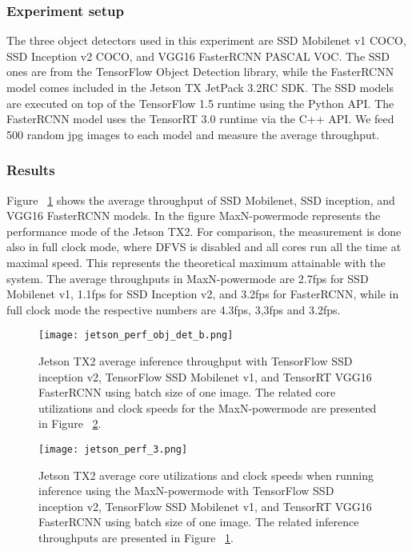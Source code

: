 \documentclass[sigconf]{acmart}
\begin{document}
\subsubsection{Experiment setup}

The three object detectors used in this experiment are SSD Mobilenet v1 COCO, SSD Inception v2 COCO, and VGG16 FasterRCNN PASCAL VOC. The SSD ones are from the TensorFlow Object Detection library, while the FasterRCNN model comes included in the Jetson TX JetPack 3.2RC SDK. The SSD models are executed on top of the TensorFlow 1.5 runtime using the Python API. The FasterRCNN model uses the TensorRT 3.0 runtime via the C++ API. We feed 500 random jpg images to each model and measure the average throughput.

\subsubsection{Results}

Figure ~\ref{fig:jetson_perf_obj_det} shows the average throughput of SSD Mobilenet, SSD inception, and VGG16 FasterRCNN models. 
In the figure MaxN-powermode represents the performance mode of the Jetson TX2. For comparison, the measurement is done also in full clock mode, where DFVS is disabled and all cores run all the time at maximal speed. This represents the theoretical maximum attainable with the system. The average throughputs in MaxN-powermode are 2.7fps for SSD Mobilenet v1, 1.1fps for SSD Inception v2, and 3.2fps for FasterRCNN, while in full clock mode the respective numbers are 4.3fps, 3,3fps and 3.2fps.

\begin{figure}[t]
\centering
\texttt{[image: jetson\_perf\_obj\_det\_b.png]}
\caption{Jetson TX2 average inference throughput with TensorFlow SSD inception v2, TensorFlow SSD Mobilenet v1, and TensorRT VGG16 FasterRCNN using batch size of one image. The related core utilizations and clock speeds for the MaxN-powermode are presented in Figure ~\ref{fig:jetson_perf_3}.}

\label{fig:jetson_perf_obj_det}
\end{figure}\begin{figure}[t]
\centering
\texttt{[image: jetson\_perf\_3.png]}
\caption{Jetson TX2 average core utilizations and clock speeds when running inference using the MaxN-powermode with TensorFlow SSD inception v2, TensorFlow SSD Mobilenet v1, and TensorRT VGG16 FasterRCNN using batch size of one image. The related inference throughputs are presented in Figure ~\ref{fig:jetson_perf_obj_det}.}
\label{fig:jetson_perf_3}
\end{figure}
\end{document}
